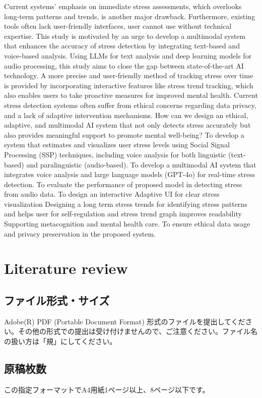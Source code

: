 \documentclass[a4j]{article}
\begin{document}
Current systems' emphasis on immediate stress assessments, which overlooks long-term patterns and trends, is another major drawback. Furthermore, existing tools often lack user-friendly interfaces, user cannot use without technical expertise.
This study is motivated by an urge to develop a multimodal system that enhances the accuracy of stress detection by integrating text-based and voice-based analysis. Using LLMs for text analysis and deep learning models for audio processing, this study aims to close the gap between state-of-the-art AI technology. A more precise and user-friendly method of tracking stress over time is provided by incorporating interactive features like stress trend tracking, which also enables users to take proactive measures for improved mental health.
  Current stress detection systems often suffer from ethical concerns regarding data privacy, and a lack of adaptive intervention mechanisms. How can we design an ethical, adaptive, and multimodal AI system that not only detects stress accurately but also provides meaningful support to promote mental well-being?
To develop a system that estimates and visualizes user stress levels using Social Signal Processing (SSP) techniques, including voice analysis for both linguistic (text-based) and paralinguistic (audio-based).
   To develop a multimodal AI system that integrates voice analysis and large language models (GPT-4o) for real-time stress detection.
   To evaluate the performance of proposed model in detecting stress from audio data.
   To design an interactive  Adaptive UI for clear stress visualization
   Designing a long term stress trends for identifying stress patterns and helps user for self-regulation and stress trend graph improves readability
   Supporting metacognition and mental health care.
    To ensure ethical data usage and privacy preservation in the proposed system.
\section{Literature review}
\subsection{ファイル形式・サイズ}
Adobe(R) PDF (Portable Document Format) 形式のファイルを提出してください。その他の形式での提出は受け付けませんので、ご注意ください。ファイル名の扱い方は「規」にしてください。

\subsection{原稿枚数}
この指定フォーマットでA4用紙1ページ以上、8ページ以下です。
\end{document}
